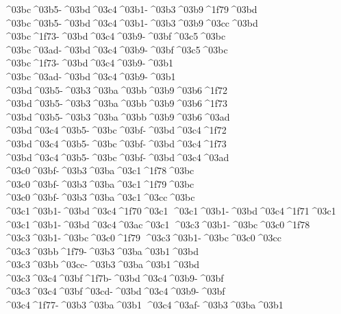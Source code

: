 {^^^^03bc^^^^03b5-^^^^03bd^^^^03c4^^^^03b1-^^^^03b3^^^^03b9^^^^1f79^^^^03bd  ^^^^03bc^^^^03b5-^^^^03bd^^^^03c4^^^^03b1-^^^^03b3^^^^03b9^^^^03cc^^^^03bd
^^^^03bc^^^^1f73-^^^^03bd^^^^03c4^^^^03b9-^^^^03bf^^^^03c5^^^^03bc  ^^^^03bc^^^^03ad-^^^^03bd^^^^03c4^^^^03b9-^^^^03bf^^^^03c5^^^^03bc
^^^^03bc^^^^1f73-^^^^03bd^^^^03c4^^^^03b9-^^^^03b1  ^^^^03bc^^^^03ad-^^^^03bd^^^^03c4^^^^03b9-^^^^03b1
^^^^03bd^^^^03b5-^^^^03b3^^^^03ba^^^^03bb^^^^03b9^^^^03b6^^^^1f72
^^^^03bd^^^^03b5-^^^^03b3^^^^03ba^^^^03bb^^^^03b9^^^^03b6^^^^1f73  ^^^^03bd^^^^03b5-^^^^03b3^^^^03ba^^^^03bb^^^^03b9^^^^03b6^^^^03ad
^^^^03bd^^^^03c4^^^^03b5-^^^^03bc^^^^03bf-^^^^03bd^^^^03c4^^^^1f72
^^^^03bd^^^^03c4^^^^03b5-^^^^03bc^^^^03bf-^^^^03bd^^^^03c4^^^^1f73  ^^^^03bd^^^^03c4^^^^03b5-^^^^03bc^^^^03bf-^^^^03bd^^^^03c4^^^^03ad
^^^^03c0^^^^03bf-^^^^03b3^^^^03ba^^^^03c1^^^^1f78^^^^03bc
^^^^03c0^^^^03bf-^^^^03b3^^^^03ba^^^^03c1^^^^1f79^^^^03bc  ^^^^03c0^^^^03bf-^^^^03b3^^^^03ba^^^^03c1^^^^03cc^^^^03bc
^^^^03c1^^^^03b1-^^^^03bd^^^^03c4^^^^1f70^^^^03c1
^^^^03c1^^^^03b1-^^^^03bd^^^^03c4^^^^1f71^^^^03c1  ^^^^03c1^^^^03b1-^^^^03bd^^^^03c4^^^^03ac^^^^03c1
^^^^03c3^^^^03b1-^^^^03bc^^^^03c0^^^^1f78
^^^^03c3^^^^03b1-^^^^03bc^^^^03c0^^^^1f79  ^^^^03c3^^^^03b1-^^^^03bc^^^^03c0^^^^03cc
^^^^03c3^^^^03bb^^^^1f79-^^^^03b3^^^^03ba^^^^03b1^^^^03bd  ^^^^03c3^^^^03bb^^^^03cc-^^^^03b3^^^^03ba^^^^03b1^^^^03bd
^^^^03c3^^^^03c4^^^^03bf^^^^1f7b-^^^^03bd^^^^03c4^^^^03b9-^^^^03bf  ^^^^03c3^^^^03c4^^^^03bf^^^^03cd-^^^^03bd^^^^03c4^^^^03b9-^^^^03bf
^^^^03c4^^^^1f77-^^^^03b3^^^^03ba^^^^03b1  ^^^^03c4^^^^03af-^^^^03b3^^^^03ba^^^^03b1
}
\endinput

